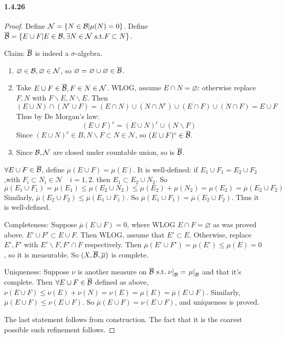\documentclass{article}
\begin{document}
\paragraph{1.4.26}
\begin{proof}
Define $\mathcal{N}=\{N\in\mathcal{B}|\mu(N)=0\}$. Define $\overline{\mathcal{B}}=\{E\cup F|E\in\mathcal{B},\exists N\in \mathcal{N}\text{ s.t.} F\subset N\}$.

Claim: $\overline{\mathcal{B}}$ is indeed a $\sigma$-algebra. 
\begin{enumerate}
\item $\varnothing\in \mathcal{B},\varnothing\in \mathcal{N}$, so $\varnothing=\varnothing\cup\varnothing \in \overline{\mathcal{B}}$. 
\item Take $E\cup F\in\overline{\mathcal{B}}, F\in N\in\mathcal{N}$. WLOG, assume $E\cap N=\varnothing$: otherwise replace $F,N$ with $F\backslash E, N\backslash E$. Then \[(E\cup N)\cap (N^c\cup F)=(E\cap N)\cup (N\cap N^c)\cup (E\cap F)\cup (N\cap F)=E\cup F\]
Thus by De Morgan's law:
\[(E\cup F)^c=(E\cup N)^c\cup (N\backslash F)\]
Since $(E\cup N)^c\in B, N\backslash F\subset N\in\mathcal{N}$, so $(E\cup F)^c \in \overline{\mathcal{B}}$.
\item Since $\mathcal{B},\mathcal{N}$ are closed under countable union, so is $\overline{\mathcal{B}}$. 
\end{enumerate}
$\forall E\cup F\in\overline{\mathcal{B}}$, define $\overline{\mu}(E\cup F)=\mu(E)$. It is well-defined: if $E_1\cup F_1=E_2\cup F_2$,with $F_i\subset N_i\in \mathcal{N}\quad i=1,2 $. then $E_1\subset E_2\cup N_2$. So
$\overline{\mu}(E_1\cup F_1)=\mu(E_1)\leq \mu(E_2\cup N_2)\leq \mu(E_2)+\mu(N_2)=\mu(E_2)=\overline{\mu}(E_2\cup F_2)$
Similarly, $\overline{\mu}(E_2\cup F_2)\leq \overline{\mu}(E_1\cup F_1)$. So $\overline{\mu}(E_1\cup F_1)=\overline{\mu}(E_2\cup F_2)$. Thus it is well-defined. 

Completeness: Suppose $\overline{\mu}(E\cup F)=0$, where WLOG $E\cap F=\varnothing$ as was proved above. $E'\cup F'\subset E\cup F$. Then WLOG, assume that $E'\subset E$. Otherwise, replace $E',F'$ with $E'\backslash F, F'\cap F$ respectively. Then $\overline{\mu}(E'\cup F')=\mu(E')\leq \mu(E)=0$, so it is measurable. So $(X,\overline{\mathcal{B}},\overline{\mu})$ is complete. 

Uniqueness: Suppose $\nu$ is another measure on $\overline{\mathcal{B}}\text{ s.t.} \left.\nu\right|_{\mathcal{B}}=\left.\mu\right|_{\mathcal{B}}$ and that it's complete. Then $\forall E\cup F\in \overline{\mathcal{B}}$ defined as above, $\nu(E\cup F)\leq \nu(E)+\nu(N)=\nu (E)=\mu(E)=\overline{\mu}(E\cup F)$. Similarly, $\overline{\mu}(E\cup F)\leq \nu(E\cup F)$. So $\overline{\mu}(E\cup F)=\nu(E\cup F)$, and uniqueness is proved.

The last statement follows from construction. The fact that it is the coarest possible such refinement follows.
\end{proof}
\end{document}
